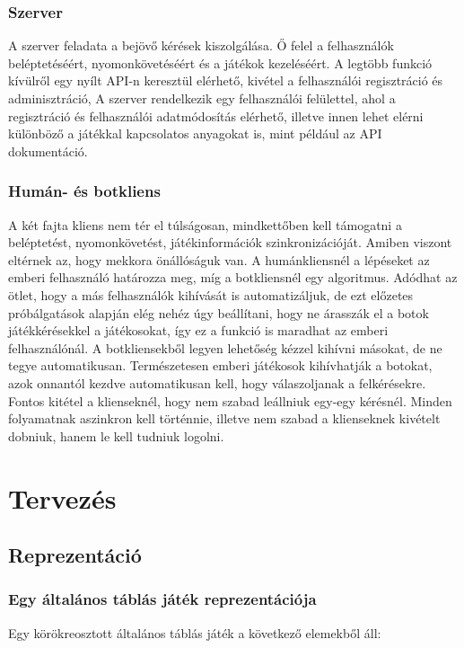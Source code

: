 \documentclass[twoside, a4paper, 12pt]{article}
\begin{document}
\subsubsection{Szerver}
A szerver feladata a bejövő kérések kiszolgálása. Ő felel a felhasználók beléptetéséért, nyomonkövetéséért és a játékok kezeléséért. A legtöbb funkció kívülről egy nyílt API-n keresztül elérhető, kivétel a felhasználói regisztráció és adminisztráció,
A szerver rendelkezik egy felhasználói felülettel, ahol a regisztráció és felhasználói adatmódosítás elérhető, illetve innen lehet elérni különböző a játékkal kapcsolatos anyagokat is, mint például az API dokumentáció.

\subsubsection{Humán- és botkliens}
A két fajta kliens nem tér el túlságosan, mindkettőben kell támogatni a beléptetést, nyomonkövetést, játékinformációk szinkronizációját. Amiben viszont eltérnek az, hogy mekkora önállóságuk van. A humánkliensnél a lépéseket az emberi felhasználó határozza meg, míg a botkliensnél egy algoritmus. Adódhat az ötlet, hogy a más felhasználók kihívását is automatizáljuk, de ezt előzetes próbálgatások alapján elég nehéz úgy beállítani, hogy ne árasszák el a botok játékkérésekkel a játékosokat, így ez a funkció is maradhat az emberi felhasználónál. A botkliensekből legyen lehetőség kézzel kihívni másokat, de ne tegye automatikusan. Természetesen emberi játékosok kihívhatják a botokat, azok onnantól kezdve automatikusan kell, hogy válaszoljanak a felkérésekre.
Fontos kitétel a klienseknél, hogy nem szabad leállniuk egy-egy kérésnél. Minden folyamatnak aszinkron kell történnie, illetve
nem szabad a klienseknek kivételt dobniuk, hanem le kell tudniuk logolni.


\newpage
\section{Tervezés}
\subsection{Reprezentáció}

\subsubsection{Egy általános táblás játék reprezentációja}

Egy körökreosztott általános táblás játék a következő elemekből áll:
\end{document}

